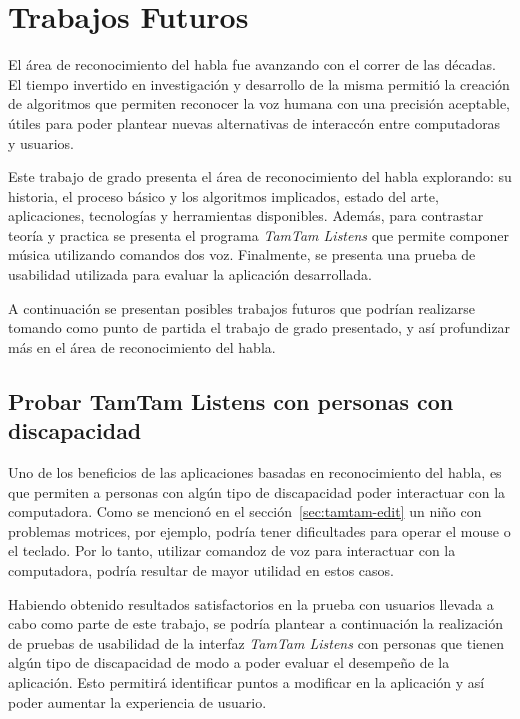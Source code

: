 \chapter{Trabajos Futuros}
\label{sec:trabajos-futuros}

El \'area de reconocimiento del habla fue avanzando con el correr de las d\'ecadas. El tiempo invertido
en investigaci\'on y desarrollo de la misma permiti\'o la creaci\'on de algoritmos que permiten
reconocer la voz humana con una precisi\'on aceptable, \'utiles para poder plantear nuevas alternativas
de interacc\'on entre computadoras y usuarios. 

Este trabajo de grado presenta el \'area de reconocimiento del habla explorando: su historia, el proceso
b\'asico y los algoritmos implicados, estado del arte, aplicaciones, tecnolog\'ias y herramientas disponibles.
Adem\'as, para contrastar teor\'ia y practica se presenta el programa \emph{TamTam Listens} que permite componer
m\'usica utilizando comandos dos voz. Finalmente, se presenta una prueba de usabilidad utilizada para evaluar la
aplicaci\'on desarrollada.

A continuaci\'on se presentan posibles trabajos futuros que podr\'ian realizarse tomando como punto de partida
el trabajo de grado presentado, y as\'i profundizar m\'as en el \'area de reconocimiento del habla.

\section{Probar TamTam Listens con personas con discapacidad}

Uno de los beneficios de las aplicaciones basadas en reconocimiento del habla, es que permiten a personas con alg\'un
tipo de discapacidad poder interactuar con la computadora. Como se mencion\'o en el secci\'on~\ref{sec:tamtam-edit}
un ni\~no con problemas motrices, por ejemplo, podr\'ia tener dificultades para operar el mouse o el teclado. 
Por lo tanto, utilizar comandoz de voz para interactuar con la computadora, podr\'ia resultar de mayor utilidad
en estos casos.

Habiendo obtenido resultados satisfactorios en la prueba con usuarios llevada a cabo como parte de este trabajo, 
se podr\'ia plantear a continuación la realización de pruebas de usabilidad de la interfaz \emph{TamTam Listens} 
con personas que tienen alg\'un tipo de discapacidad de modo a poder evaluar el desempe\~no de la aplicaci\'on. 
Esto permitir\'a identificar puntos a modificar en la aplicaci\'on y as\'i poder aumentar la experiencia de usuario.
